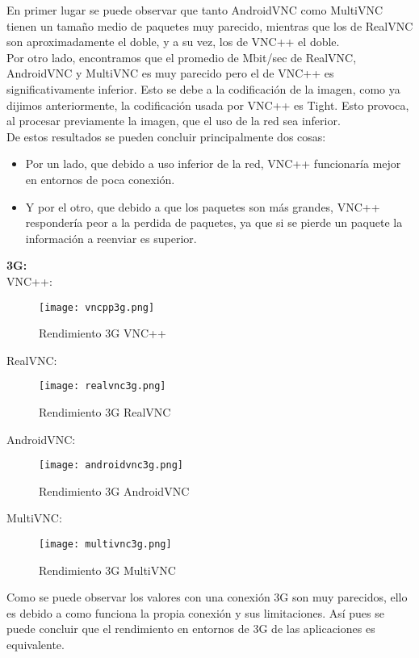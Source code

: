 En primer lugar se puede observar que tanto AndroidVNC como MultiVNC tienen un tamaño medio de paquetes muy parecido, mientras que los de RealVNC son aproximadamente el doble, y a su vez, los de VNC++ el doble.\\

Por otro lado, encontramos que el promedio de Mbit/sec de RealVNC, AndroidVNC y MultiVNC es muy parecido pero el de VNC++ es significativamente inferior. Esto se debe a la codificación de la imagen, como ya dijimos anteriormente, la codificación usada por VNC++ es Tight. Esto provoca, al procesar previamente la imagen, que el uso de la red sea inferior.\\

De estos resultados se pueden concluir principalmente dos cosas:
\begin{itemize}
\item Por un lado, que debido a uso inferior de la red, VNC++ funcionaría mejor en entornos de poca conexión.
\item Y por el otro, que debido a que los paquetes son más grandes, VNC++ respondería peor a la perdida de paquetes, ya que si se pierde un paquete la información a reenviar es superior.
\end{itemize}
\newpage
\textbf{3G:}\\

VNC++:
\begin{figure}[h]
\begin{flushleft}
\texttt{[image: vncpp3g.png]}
\end{flushleft}
\caption{Rendimiento 3G VNC++}
\end{figure}

RealVNC:
\begin{figure}[h]
\begin{flushleft}
\texttt{[image: realvnc3g.png]}
\end{flushleft}
\caption{Rendimiento 3G RealVNC}
\end{figure}

AndroidVNC:
\begin{figure}[h]
\begin{flushleft}
\texttt{[image: androidvnc3g.png]}
\end{flushleft}
\caption{Rendimiento 3G AndroidVNC}
\end{figure}
\newpage
MultiVNC:
\begin{figure}[h]
\begin{flushleft}
\texttt{[image: multivnc3g.png]}
\end{flushleft}
\caption{Rendimiento 3G MultiVNC}
\end{figure}

Como se puede observar los valores con una conexión 3G son muy parecidos, ello es debido a como funciona la propia conexión y sus limitaciones. Así pues se puede concluir que el rendimiento en entornos de 3G de las aplicaciones es equivalente. 
